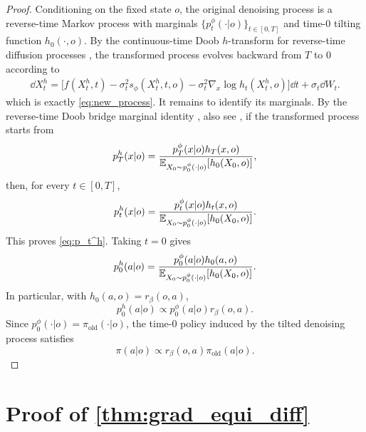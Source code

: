 \begin{proof}
Conditioning on the fixed state $o$, the original denoising process is a reverse-time Markov process
with marginals $\{p_t^\phi(\cdot|o)\}_{t\in[0,T]}$ and time-$0$ tilting function $h_0(\cdot,o)$.
By the continuous-time Doob $h$-transform for reverse-time diffusion processes
\cite[Proposition~2]{nguyen2025h}, the transformed process evolves backward from $T$ to $0$ according to
\begin{align*}
    \dd X_t^{h}
    =
    \Big[
        f(X_t^{h},t)
        -\sigma_t^2 s_\phi(X_t^{h},t,o)
        -\sigma_t^2 \nabla_x \log h_t(X_t^{h},o)
    \Big]\dd t
    +\sigma_t\dd W_t.
\end{align*}
which is exactly \eqref{eq:new_process}.
It remains to identify its marginals. By the reverse-time Doob bridge marginal identity
\cite[Proposition~1]{nguyen2025h}, also see \cite[Section~3.2]{zhu2026training}, if the transformed process starts from
\[
    p_T^h(x|o)
    =
    \frac{
        p_T^\phi(x|o)h_T(x,o)
    }{
        \operatorname*{{\mathbb{E}}}_{X_0\sim p_0^\phi(\cdot|o)}[h_0(X_0,o)]
    },
\]
then, for every $t\in[0,T]$,
\[
    p_t^h(x|o)
    =
    \frac{
        p_t^\phi(x|o)h_t(x,o)
    }{
        \operatorname*{{\mathbb{E}}}_{X_0\sim p_0^\phi(\cdot|o)}[h_0(X_0,o)]
    }.
\]
This proves \eqref{eq:p_t^h}.
Taking $t=0$ gives
\[
    p_0^h(a|o)
    =
    \frac{
        p_0^\phi(a|o)h_0(a,o)
    }{
        \operatorname*{{\mathbb{E}}}_{X_0\sim p_0^\phi(\cdot|o)}[h_0(X_0,o)]
    }.
\]
In particular, with $h_0(a,o)=r_\beta(o,a)$,
\[
    p_0^h(a|o)
    \propto
    p_0^\phi(a|o)r_\beta(o,a).
\]
Since $p_0^\phi(\cdot|o)=\pi_{\mathrm{old}}(\cdot|o)$, the time-$0$ policy induced by the tilted
denoising process satisfies
\[
    \pi(a|o)
    \propto
    r_\beta(o,a)\pi_{\mathrm{old}}(a|o).
\]
\end{proof}



\section{\texorpdfstring{Proof of \cref{thm:grad_equi_diff}}{Proof of Theorem \ref{thm:grad_equi_diff}}}
\label{sec:proof_grad_equi}

